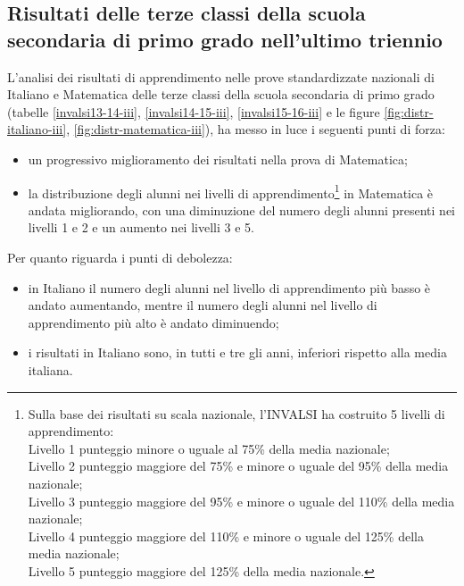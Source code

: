 \documentclass[12pt,a4paper,oneside]{memoir}
\begin{document}
\subsection[Terze classi della scuola secondaria]{Risultati delle terze classi della scuola secondaria di primo grado nell'ultimo triennio}
L'analisi dei risultati di apprendimento nelle prove standardizzate nazionali di Italiano e Matematica delle terze classi della scuola secondaria di primo grado (tabelle \ref{invalsi13-14-iii}, \ref{invalsi14-15-iii}, \ref{invalsi15-16-iii} e le figure \ref{fig:distr-italiano-iii}, \ref{fig:distr-matematica-iii}), ha messo in luce i seguenti punti di forza:
\begin{itemize}
\item un progressivo miglioramento dei risultati nella prova di Matematica;
\item la distribuzione degli alunni nei livelli di apprendimento\footnote{Sulla base dei risultati su scala nazionale, l'INVALSI ha costruito 5 livelli di apprendimento:\\
Livello 1 punteggio minore o uguale al 75\% della media nazionale;\\
Livello 2 punteggio maggiore del 75\% e minore o uguale del 95\% della media nazionale;\\
Livello 3 punteggio maggiore del 95\% e minore o uguale del 110\% della media nazionale;\\
Livello 4 punteggio maggiore del 110\% e minore o uguale del 125\% della media nazionale;\\
Livello 5 punteggio maggiore del 125\% della media nazionale.} in Matematica è andata migliorando, con una diminuzione del numero degli alunni presenti nei livelli 1 e 2 e un aumento nei livelli 3 e 5.
\end{itemize}
Per quanto riguarda i punti di debolezza:
\begin{itemize}
\item in Italiano il numero degli alunni nel livello di apprendimento più basso è andato aumentando, mentre il numero degli alunni nel livello di apprendimento più alto è andato diminuendo;
\item i risultati in Italiano sono, in tutti e tre gli anni, inferiori rispetto alla media italiana.
\end{itemize}
\end{document}

